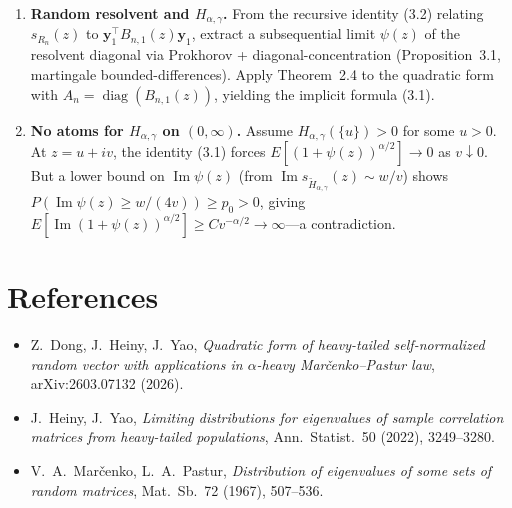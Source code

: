 \documentclass[11pt,a4paper]{article}
\theoremstyle{definition}
\begin{document}
\begin{enumerate}[leftmargin=*,label=\textbf{Step \arabic*.}]
\item \textbf{Random resolvent and $H_{\alpha,\gamma}$.}
From the recursive identity (3.2) relating $s_{R_n}(z)$ to $\mathbf{y}_1^\top B_{n,1}(z)\mathbf{y}_1$, extract a subsequential limit $\psi(z)$ of the resolvent diagonal via Prokhorov + diagonal-concentration (Proposition~3.1, martingale bounded-differences).  Apply Theorem~2.4 to the quadratic form with $A_n=\operatorname{diag}(B_{n,1}(z))$, yielding the implicit formula (3.1).

\item \textbf{No atoms for $H_{\alpha,\gamma}$ on $(0,\infty)$.}
Assume $H_{\alpha,\gamma}(\{u\})>0$ for some $u>0$. At $z=u+iv$, the identity (3.1) forces $E[(1+\psi(z))^{\alpha/2}]\to 0$ as $v\downarrow 0$.  But a lower bound on $\operatorname{Im}\psi(z)$ (from $\operatorname{Im}s_{\widetilde{H}_{\alpha,\gamma}}(z)\sim w/v$) shows $P(\operatorname{Im}\psi(z)\ge w/(4v))\ge p_0>0$, giving $E[\operatorname{Im}(1+\psi(z))^{\alpha/2}]\ge C v^{-\alpha/2}\to\infty$---a contradiction.

\end{enumerate}

\section*{References}
\begin{itemize}[leftmargin=*,label={},itemsep=0pt]
\item Z.~Dong, J.~Heiny, J.~Yao, \emph{Quadratic form of heavy-tailed self-normalized random vector with applications in $\alpha$-heavy Mar\v{c}enko--Pastur law}, arXiv:2603.07132 (2026).
\item J.~Heiny, J.~Yao, \emph{Limiting distributions for eigenvalues of sample correlation matrices from heavy-tailed populations}, Ann.\ Statist.\ 50 (2022), 3249--3280.
\item V.~A.~Mar\v{c}enko, L.~A.~Pastur, \emph{Distribution of eigenvalues of some sets of random matrices}, Mat.\ Sb.\ 72 (1967), 507--536.
\end{itemize}
\end{document}
